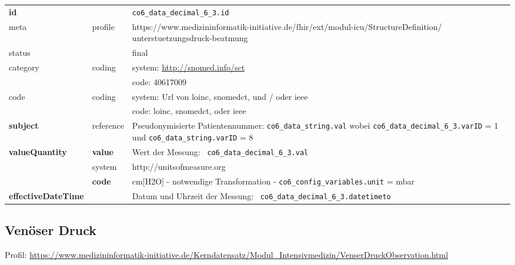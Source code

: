 \begin{longtable}{|l|l|p{7.5cm}|}
	\hline
	\rowcolor{lightgray} \multicolumn{3}{|l|}{Data Mapping (inhaltlich)} \\ \hline
	\textbf{id} &  & \texttt{co6\_data\_decimal\_6\_3.id} \\ \hline
	meta & profile & https://www.medizininformatik-initiative.de/fhir/ext/modul-icu/StructureDefinition/
	unterstuetzungsdruck-beatmung \\ \hline 
	status &  & final   \\ \hline 
	category & coding & system: \url{http://snomed.info/sct} \\
	\cline{3-3}
	& & code: 40617009 \\ \hline
	code & coding & system: Url von \ac{loinc}, \ac{snomedct}, und / oder \ac{ieee} \\ 
	\cline{3-3} 
	&  & code: \ac{loinc}, \ac{snomedct}, oder \ac{ieee} \\ \hline
	\textbf{subject} & reference & Pseudonymisierte Patientennummer: \texttt{co6\_data\_string.val} wobei \texttt{co6\_data\_decimal\_6\_3.varID} = 1 und \texttt{co6\_data\_string.varID} = 8 \\ \hline
	\textbf{valueQuantity}  & \textbf{value} & Wert der Messung: \texttt{
		co6\_data\_decimal\_6\_3.val} \\
	\cline{2-3}
	& system & http://unitsofmeasure.org \\
	\cline{2-3}
	& \textbf{code} & cm[H2O] - notwendige Transformation - \texttt{co6\_config\_variables.unit} = mbar
	\\ \hline
	\textbf{effectiveDateTime}  & & Datum und Uhrzeit der Messung: \texttt{
		co6\_data\_decimal\_6\_3.datetimeto} \\
	\hline
\end{longtable}

\subsection{Venöser Druck} 

Profil: \url{https://www.medizininformatik-initiative.de/Kerndatensatz/Modul_Intensivmedizin/VenserDruckObservation.html}

